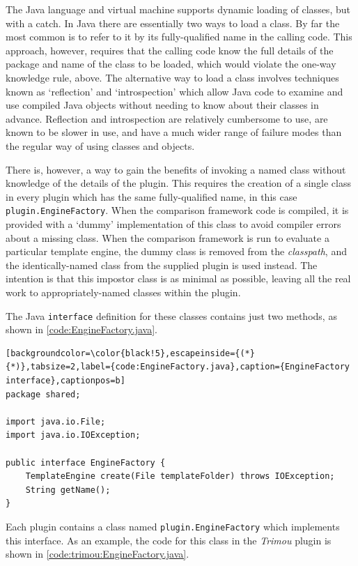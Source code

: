 The Java language and virtual machine supports dynamic loading of classes, but with a catch. In Java there are essentially two ways to load a class. By far the most common is to refer to it by its fully-qualified name in the calling code. This approach, however, requires that the calling code know the full details of the package and name of the class to be loaded, which would violate the one-way knowledge rule, above. The alternative way to load a class involves techniques known as `reflection' and `introspection' which allow Java code to examine and use compiled Java objects without needing to know about their classes in advance. Reflection and introspection are relatively cumbersome to use, are known to be slower in use, and have a much wider range of failure modes than the regular way of using classes and objects.

There is, however, a way to gain the benefits of invoking a named class without knowledge of the details of the plugin. This requires the creation of a single class in every plugin which has the same fully-qualified name, in this case \verb!plugin.EngineFactory!. When the comparison framework code is compiled, it is provided with a `dummy' implementation of this class to avoid compiler errors about a missing class. When the comparison framework is run to evaluate a particular template engine, the dummy class is removed from the \emph{classpath}, and the identically-named class from the supplied plugin is used instead. The intention is that this impostor class is as minimal as possible, leaving all the real work to appropriately-named classes within the plugin. 

The Java \verb!interface! definition for these classes contains just two methods, as shown in \autoref{code:EngineFactory.java}.

\begin{lstlisting}[backgroundcolor=\color{black!5},escapeinside={(*}{*)},tabsize=2,label={code:EngineFactory.java},caption={EngineFactory interface},captionpos=b]
package shared;

import java.io.File;
import java.io.IOException;

public interface EngineFactory {
    TemplateEngine create(File templateFolder) throws IOException;
    String getName();
}
\end{lstlisting}

Each plugin contains a class named \verb!plugin.EngineFactory! which implements this interface.  As an example, the code for this class in the \emph{Trimou} plugin is shown in \autoref{code:trimou:EngineFactory.java}.

